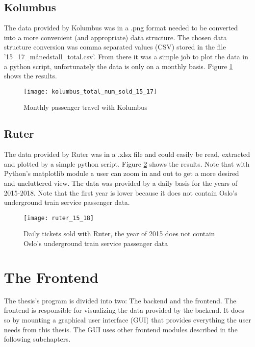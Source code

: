 \subsection{Kolumbus}
The data provided by Kolumbus was in a .png format needed to be converted into a more convenient (and appropriate) data structure. The chosen data structure conversion was comma separated values (CSV) stored in the file '15\_17\_månedstall\_total.csv'. From there it was a simple job to plot the data in a python script, unfortunately the data is only on a monthly basis. Figure \ref{fig:kolumbus_15_17} shows the results.

\begin{figure}[ht]
\texttt{[image: kolumbus\_total\_num\_sold\_15\_17]}
\centering
\caption{Monthly passenger travel with Kolumbus}
\label{fig:kolumbus_15_17}
\end{figure}









\subsection{Ruter}
The data provided by Ruter was in a .xlsx file and could easily be read, extracted and plotted by a simple python script. Figure \ref{fig:ruter_15_18} shows the results. Note that with Python's matplotlib module a user can zoom in and out to get a more desired and uncluttered view. The data was provided by a daily basis for the years of 2015-2018. Note that the first year is lower because it does not contain Oslo's underground train service passenger data.

\begin{figure}[ht]
\texttt{[image: ruter\_15\_18]}
\centering
\caption{Daily tickets sold with Ruter, the year of 2015 does not contain Oslo's underground train service passenger data}
\label{fig:ruter_15_18}
\end{figure}











\section{The Frontend}
The thesis's program is divided into two: The backend and the frontend. The frontend is responsible for visualizing the data provided by the backend. It does so by mounting a graphical user interface (GUI) that provides everything the user needs from this thesis. The GUI uses other frontend modules described in the following subchapters.

